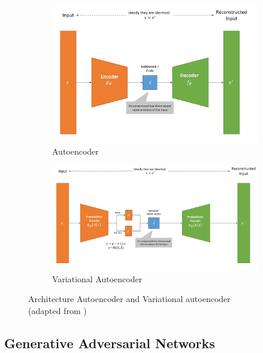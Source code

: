 \begin{figure}[H]
    \begin{subfigure}{0.8\textwidth}
      \includegraphics[width=\linewidth]{images/ae.png}
      \caption{Autoencoder} \label{fig:ae}
    \end{subfigure}%
    \hspace*{\fill}   %
    \begin{subfigure}{0.8\textwidth}
      \includegraphics[width=\linewidth]{images/vae.png}
      \caption{Variational Autoencoder} \label{fig:vae}
    \end{subfigure}%
    \hspace*{\fill}   %
  \captionsetup{justification=centering}
  \caption[Autoencoders]{Architecture Autoencoder and Variational autoencoder \\(adapted from \cite{weng2018AutoencoderBetaVAE})} \label{fig:vae_overview}
\end{figure}

\subsection{Generative Adversarial Networks}
\label{ch:preliminaries-generativeAdversarialNetworks}

